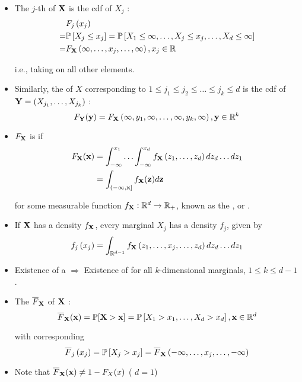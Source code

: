 \begin{itemize}[leftmargin=*]
    \item The $j$-th  of $\boldsymbol{\mathbf{X}}$ is the cdf of $X_{j}$ :
$$
\begin{aligned}
&F_{j}\left(x_{j}\right)\\
=&\mathbb{P}\left[X_{j} \leq x_{j}\right]=\mathbb{P}\left[X_{1} \leq \infty, \ldots, X_{j} \leq x_{j}, \ldots, X_{d} \leq \infty\right] \\
=&F_{\boldsymbol{\mathbf{X}}}\left(\infty, \ldots, x_{j}, \ldots, \infty\right), x_{j} \in \mathbb{R}
\end{aligned}
$$

    i.e., taking  on all other elements.
    \item Similarly, the  of $X$ corresponding to $1 \leq j_{1} \leq j_{2} \leq \ldots \leq j_{k} \leq d$ is the cdf of $\boldsymbol{\mathbf{Y}}=\left(X_{j_{1}}, \ldots, X_{j_{k}}\right)$ :
$$
F_{\boldsymbol{\mathbf{Y}}}(\boldsymbol{\mathbf{y}})=F_{\boldsymbol{\mathbf{X}}}\left(\infty, y_{1}, \infty, \ldots, \infty, y_{k}, \infty\right), \boldsymbol{\mathbf{y}} \in \mathbb{R}^{k}
$$
    \item $F_{\boldsymbol{\mathbf{X}}}$ is  if
$$
\begin{aligned}
F_{\boldsymbol{\mathbf{X}}}(\boldsymbol{\mathbf{x}})&=\int_{-\infty}^{x_{1}} \ldots \int_{-\infty}^{x_{d}} f_{\boldsymbol{\mathbf{X}}}\left(z_{1}, \ldots, z_{d}\right) d z_{d} \ldots d z_{1} \\
&=\int_{(-\infty, \boldsymbol{\mathbf{x}}]} f_{\boldsymbol{\mathbf{X}}}(\boldsymbol{\mathbf{z}}) d \boldsymbol{\mathbf{z}}
\end{aligned}
$$

for some measurable function $f_{\boldsymbol{\mathbf{X}}}: \mathbb{R}^{d} \rightarrow \mathbb{R}_{+}$, known as the , or .

    \item If $\operatorname{\boldsymbol{\mathbf{X}}}$ has a density $f_{\boldsymbol{\mathbf{X}}}$, every marginal $X_{j}$ has a density $f_{j}$, given by
$$
f_{j}\left(x_{j}\right)=\int_{\mathbb{R}^{d-1}} f_{\boldsymbol{\mathbf{X}}}\left(z_{1}, \ldots, x_{j}, \ldots, z_{d}\right) d z_{d} \ldots d z_{1}
$$
    \item Existence of a  $\Rightarrow$ Existence of  for all $k$-dimensional marginals, $1 \leq k \leq d-1$. 
    \item The  $\overline{F}_{\operatorname{\boldsymbol{\mathbf{X}}}}$ of $\operatorname{\boldsymbol{\mathbf{X}}}$ :
$$
\overline{F}_{\boldsymbol{\mathbf{X}}}(\boldsymbol{\mathbf{x}})=\mathbb{P}[\boldsymbol{\mathbf{X}}>\boldsymbol{\mathbf{x}}]=\mathbb{P}\left[X_{1}>x_{1}, \ldots, X_{d}>x_{d}\right], \boldsymbol{\mathbf{x}} \in \mathbb{R}^{d}
$$

with corresponding 
$$
\overline{F}_{j}\left(x_{j}\right)=\mathbb{P}\left[X_{j}>x_{j}\right]=\overline{F}_{\boldsymbol{\mathbf{X}}}\left(-\infty, \ldots, x_{j}, \ldots,-\infty\right)
$$
    \item Note that $\overline{F}_{\boldsymbol{\mathbf{X}}}(\boldsymbol{\mathbf{x}}) \neq 1-F_{X}(x)$ ( $d=1$)
\end{itemize}







